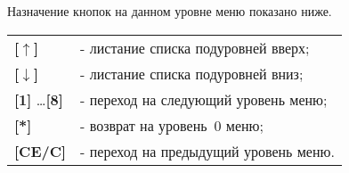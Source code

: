 Назначение кнопок на данном уровне меню показано ниже.
\begin{center}
	\begin{tabular}{p{2.5cm} p{14.5cm}}
	    \textbf{[$\uparrow$]} & - листание списка подуровней вверх; 	\tabularnewline
	    \textbf{[$\downarrow$]} & - листание списка подуровней вниз; 	\tabularnewline
	    \textbf{[1]} \ldots \textbf{[8]} & - переход на следующий уровень меню; \tabularnewline
	    \textbf{[*]} & - возврат на уровень~0 меню; 					\tabularnewline
	    \textbf{[CE/C]} & - переход на предыдущий уровень меню. \tabularnewline				
	\end{tabular} 
\end{center}


